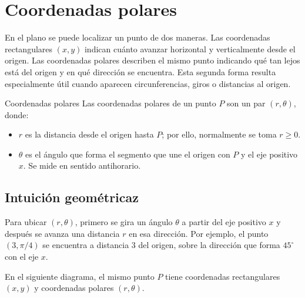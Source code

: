 \section{Coordenadas polares}

\shorthandoff{>}

En el plano se puede localizar un punto de dos maneras. Las coordenadas rectangulares $(x,y)$ indican cuánto avanzar horizontal y verticalmente desde el origen. Las coordenadas polares describen el mismo punto indicando qué tan lejos está del origen y en qué dirección se encuentra. Esta segunda forma resulta especialmente útil cuando aparecen circunferencias, giros o distancias al origen.

\begin{mydefinition}{Coordenadas polares}
Las coordenadas polares de un punto $P$ son un par $(r,\theta)$, donde:
\begin{itemize}
    \item $r$ es la distancia desde el origen hasta $P$; por ello, normalmente se toma $r\geq 0$.
    \item $\theta$ es el ángulo que forma el segmento que une el origen con $P$ y el eje positivo $x$. Se mide en sentido antihorario.
\end{itemize}
\end{mydefinition}

\subsection{Intuición geométricaz}

Para ubicar $(r,\theta)$, primero se gira un ángulo $\theta$ a partir del eje positivo $x$ y después se avanza una distancia $r$ en esa dirección. Por ejemplo, el punto $(3,\pi/4)$ se encuentra a distancia $3$ del origen, sobre la dirección que forma $45^\circ$ con el eje $x$.

En el siguiente diagrama, el mismo punto $P$ tiene coordenadas rectangulares $(x,y)$ y coordenadas polares $(r,\theta)$.

\begin{center}
\end{center}

